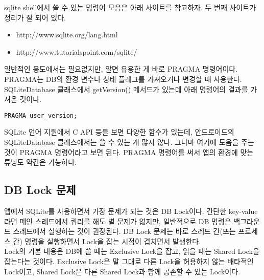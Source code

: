 sqlite shell에서 쓸 수 있는 명령어 모음은 아래 사이트를 참고하자. 두 번째 사이트가 정리가 잘 되어 있다.
\begin{itemize}
\item http://www.sqlite.org/lang.html
\item http://www.tutorialspoint.com/sqlite/
\end{itemize}



일반적인 용도에서는 필요없지만, 알면 유용한 게 바로 PRAGMA 명령어이다. PRAGMA는 DB의 환경 변수나 상태 플래그를 가져오거나 변경할 때 사용한다.
SQLiteDatabase 클래스에서 getVersion() 메서드가 있는데 아래 명령어의 결과를 가져온 것이다. 
\begin{lstlisting}[frame=single]
PRAGMA user_version; 
\end{lstlisting}

SQLite 언어 지원에서 C API 등을 보면 다양한 함수가 있는데, 안드로이드의 SQLiteDatabase 클래스에서는 쓸 수 있는 게 많지 않다.
그나마 여기에 도움을 주는 것이 PRAGMA 명령어라고 보면 된다. PRAGMA 명령어를 써서 앱의 환경에 맞는 튜닝도 약간은 가능하다.


\subsection{DB Lock 문제}
앱에서 SQLite를 사용하면서 가장 문제가 되는 것은 DB Lock이다.
간단한 key-value라면 메인 스레드에서 쿼리를 해도 별 문제가 없지만, 일반적으로 DB 명령은 백그라운드 스레드에서 실행하는 것이 권장된다. 
DB Lock 문제는 바로 스레드 간(또는 프로세스 간) 명령을 실행하면서 Lock을 잡는 시점이 겹치면서 발생한다.\\

Lock의 기본 내용은 DB에 쓸 때는 Exclusive Lock을 잡고, 읽을 때는 Shared Lock을 잡는다는 것이다.
Exclusive Lock은 말 그대로 다른 Lock을 허용하지 않는 배타적인 Lock이고, Shared Lock은 다른 Shared Lock과 함께 공존할 수 있는 Lock이다.\\

